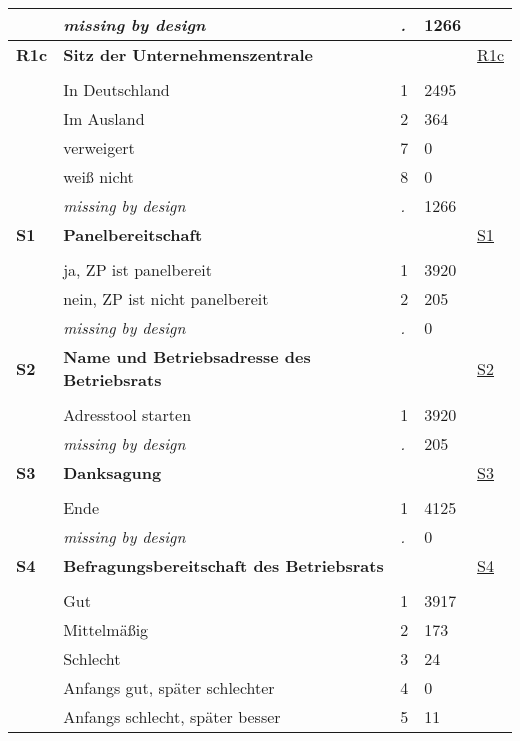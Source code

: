 \begin{longtable}{| L{2.65cm} | L{8cm} | C{1.5cm} | R{1.25cm} | C{2.25cm}  |}
   & \textit{missing by design} & \textit{.} & 1266 &  \\ 
   \midrule
\textbf{R1c}\label{var:R1c} & \textbf{Sitz der Unternehmenszentrale} &  &  & \hyperref[R1c]{R1c} \\ 
   &  &  &  &  \\ 
   & In Deutschland & 1 & 2495 &  \\ 
   & Im Ausland & 2 & 364 &  \\ 
   & verweigert & 7 & 0 &  \\ 
   & weiß nicht & 8 & 0 &  \\ 
   & \textit{missing by design} & \textit{.} & 1266 &  \\ 
   \midrule
\textbf{S1}\label{var:S1} & \textbf{Panelbereitschaft} &  &  & \hyperref[S1]{S1} \\ 
   &  &  &  &  \\ 
   & ja, ZP ist panelbereit & 1 & 3920 &  \\ 
   & nein, ZP ist nicht panelbereit & 2 & 205 &  \\ 
   & \textit{missing by design} & \textit{.} & 0 &  \\ 
   \midrule
\textbf{S2}\label{var:S2} & \textbf{Name und Betriebsadresse des Betriebsrats} &  &  & \hyperref[S2]{S2} \\ 
   &  &  &  &  \\ 
   & Adresstool starten & 1 & 3920 &  \\ 
   & \textit{missing by design} & \textit{.} & 205 &  \\ 
   \midrule
\textbf{S3}\label{var:S3} & \textbf{Danksagung} &  &  & \hyperref[S3]{S3} \\ 
   &  &  &  &  \\ 
   & Ende & 1 & 4125 &  \\ 
   & \textit{missing by design} & \textit{.} & 0 &  \\ 
   \midrule
\textbf{S4}\label{var:S4} & \textbf{Befragungsbereitschaft des Betriebsrats} &  &  & \hyperref[S4]{S4} \\ 
   &  &  &  &  \\ 
   & Gut & 1 & 3917 &  \\ 
   & Mittelmäßig & 2 & 173 &  \\ 
   & Schlecht & 3 & 24 &  \\ 
   & Anfangs gut, später schlechter & 4 & 0 &  \\ 
   & Anfangs schlecht, später besser & 5 & 11 &  \\ 

\end{longtable}
